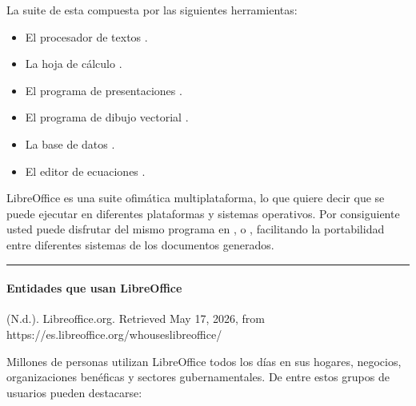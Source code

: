 \documentclass[letterpaper,10pt,spanish]{sphinxmanual}
\begin{document}
\sphinxAtStartPar
La suite de  esta compuesta por las siguientes herramientas:
\begin{itemize}
\item {} 
\sphinxAtStartPar
El procesador de textos .

\item {} 
\sphinxAtStartPar
La hoja de cálculo .

\item {} 
\sphinxAtStartPar
El programa de presentaciones .

\item {} 
\sphinxAtStartPar
El programa de dibujo vectorial .

\item {} 
\sphinxAtStartPar
La base de datos .

\item {} 
\sphinxAtStartPar
El editor de ecuaciones .

\end{itemize}

\sphinxAtStartPar
LibreOffice es una suite ofimática multi\sphinxhyphen{}plataforma, lo que quiere decir que se puede ejecutar en diferentes plataformas y sistemas operativos. Por consiguiente usted puede disfrutar del mismo programa en ,  o , facilitando la portabilidad entre diferentes sistemas de los documentos generados.


\bigskip\hrule\bigskip



\paragraph{Entidades que usan LibreOffice}
\label{\detokenize{cursos/ofimatica10/recursos/T03:entidades-que-usan-libreoffice}}
\sphinxAtStartPar
%
\begin{footnote}[2]\sphinxAtStartFootnote
(N.d.). Libreoffice.org. Retrieved May 17, 2026, from https://es.libreoffice.org/who\sphinxhyphen{}uses\sphinxhyphen{}libreoffice/
%
\end{footnote} Millones de personas utilizan LibreOffice todos los días en sus hogares, negocios, organizaciones benéficas y sectores gubernamentales. De entre estos grupos de usuarios pueden destacarse:
\end{document}
